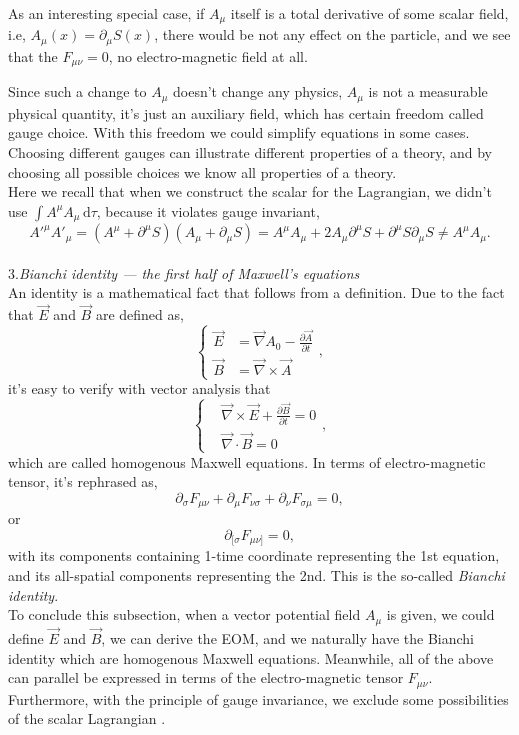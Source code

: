 \documentclass{article}
\newcommand{\be}{\begin{equation}}
\newcommand{\ee}{\end{equation}}
\newcommand{\dif}{\,\mathrm{d}}
\newcommand{\p}{\partial}
\newcommand{\1}{\left}
\newcommand{\2}{\right}
\newcommand{\m}{\mu}
\newcommand{\n}{\nu}
\begin{document}
As an interesting special case, if $A_\mu$ itself is a total derivative of some scalar field, i.e, $A_\mu(x)=\p_\mu S(x)$, there would be not any effect on the particle, and we see that the $F_{\mu\nu}=0$, no electro-magnetic field at all.

Since such a change to $A_\mu$ doesn't change any physics, $A_\mu$ is not a measurable physical quantity, it's just an auxiliary field, which has certain freedom called gauge choice. With this freedom we could simplify equations in some cases. Choosing different gauges can illustrate different properties of a theory, and by choosing all possible choices we know all properties of a theory.\\

Here we recall that when we construct the scalar for the Lagrangian, we didn't use $\int A^\m A_\m \dif\tau$, because it violates gauge invariant,
\be
A'^\m A'_\m = (A^\m + \p^\m S) (A_\m + \p_\m S) = A^\m A_\m +2 A_\m \p^\m S +  \p^\m S  \p_\m S 
\ne A^\m A_\m.
\ee
\\

3.\textsl{Bianchi identity --- the first half of Maxwell's equations}\\

An identity is a mathematical fact that follows from a definition. Due to the fact that $\vec E$ and $\vec B$ are defined as,
\be
\1\{\begin{split}
\vec E &= \vec \nabla A_0 -\frac{\p\vec A}{\p t} \\
\vec B &= \vec \nabla \times \vec A
\end{split}\2.,
\ee
it's easy to verify with vector analysis that
\be
\1\{\begin{split}
&\vec \nabla \times \vec E + \frac{\p \vec B}{\p t} = 0 \\
&\vec \nabla \cdot \vec B = 0
\end{split}\2.,
\ee
which are called homogenous Maxwell equations.
In terms of electro-magnetic tensor, it's rephrased as,
\be
\p_\sigma F_{\m\n} +\p_\m F_{\n\sigma} +\p_\n F_{\sigma\m} = 0,
\ee
or
\be
\p_{[\sigma} F_{\m\n]} = 0,
\ee
with its components containing 1-time coordinate representing the 1st equation, and its all-spatial components representing the 2nd. This is the so-called \textit{Bianchi identity}.\\

To conclude this subsection, when a vector potential field $A_\mu$ is given, we could define $\vec E$ and $\vec B$, we can derive the EOM, and we naturally have the Bianchi identity which are homogenous Maxwell equations. Meanwhile, all of the above can parallel be expressed in terms of the electro-magnetic tensor $F_{\mu\nu}$. Furthermore, with the principle of gauge invariance, we exclude some possibilities of the scalar Lagrangian .
\end{document}
